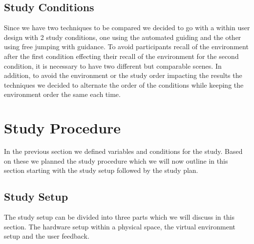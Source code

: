 \subsection{Study Conditions}
\label{subsection DPUS VC: Study Conditions}
Since we have two techniques to be compared we decided to go with a within user design with 2 study conditions, one using the automated guiding and the other using free jumping with guidance. To avoid participants recall of the environment after the first condition effecting their recall of the environment for the second condition, it is necessary to have two different but comparable scenes. In addition, to avoid the environment or the study order impacting the results the techniques we decided to alternate the order of the conditions while keeping the environment order the same each time.  
 
\section{Study Procedure}
\label{section DPUS: Study Procedure}
In the previous section we defined variables and conditions for the study. Based on these we planned the study procedure which we will now outline in this section starting with the study setup followed by the study plan.

\subsection{Study Setup}
\label{subsection DPUS SP: Study Setup}
The study setup can be divided into three parts which we will discuss in this section. The hardware setup within a physical space, the virtual environment setup and the user feedback.

